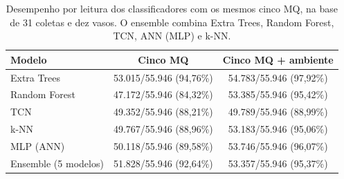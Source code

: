 \begin{table}[H]
    \centering
    \footnotesize
    \caption{Desempenho por leitura dos classificadores com os mesmos cinco MQ, na base de 31 coletas e dez vasos. O ensemble combina Extra Trees, Random Forest, TCN, ANN (MLP) e k-NN.}
    \label{tab:modelos_cinco_mq_filtrado}
    \begin{tabular}{lcc}
        \hline
        Modelo & Cinco MQ & Cinco MQ + ambiente \\
        \hline
        Extra Trees & 53.015/55.946 (94,76\%) & 54.783/55.946 (97,92\%) \\
        Random Forest & 47.172/55.946 (84,32\%) & 53.385/55.946 (95,42\%) \\
        TCN & 49.352/55.946 (88,21\%) & 49.789/55.946 (88,99\%) \\
        k-NN & 49.767/55.946 (88,96\%) & 53.183/55.946 (95,06\%) \\
        MLP (ANN) & 50.118/55.946 (89,58\%) & 53.746/55.946 (96,07\%) \\
        Ensemble (5 modelos) & 51.828/55.946 (92,64\%) & 53.357/55.946 (95,37\%) \\
        \hline
    \end{tabular}
\end{table}
